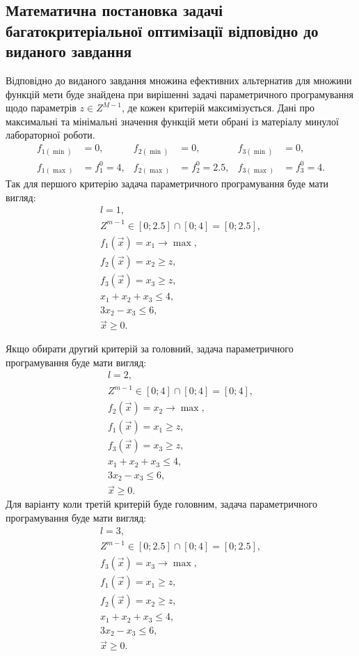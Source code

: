 \subsection{Математична постановка задачі багатокритеріальної оптимізації відповідно до виданого завдання}

Відповідно до виданого завдання множина ефективних альтернатив для множини функцій мети буде знайдена при вирішенні задачі параметричного програмування щодо параметрів $z \in Z^{M-1}$, де кожен критерій максимізується.
Дані про максимальні та мінімальні значення функцій мети обрані із матеріалу минулої лабораторної роботи.
\begin{align*}
    f_{1(\min)}&=0, &   f_{2(\min)}&=0, &   f_{3(\min)}&=0, \\
    f_{1(\max)}&=f_1^0=4,   &   f_{2(\max)}&=f_2^0=2.5, &   f_{3(\max)}&=f_3^0=4.
\end{align*} 
\clearpage
Так для першого критерію задача параметричного програмування буде мати вигляд:
\begin{gather*} 
    l = 1, \\
    Z^{m-1} \in [0; 2.5] \cap [0; 4] = [0; 2.5], \\
    f_1 (\vec{x}) = x_1 \to \max, \\
    f_2 (\vec{x}) = x_2 \geqslant z,  \\
    f_3 (\vec{x}) = x_3 \geqslant z,  \\
    x_1 + x_2 + x_3 \leqslant 4, \\
    3 x_2 - x_3 \leqslant 6, \\
    \vec{x} \geqslant 0.
\end{gather*}

Якщо обирати другий критерій за головний, задача параметричного програмування буде мати вигляд:
\begin{gather*} 
    l = 2, \\
    Z^{m-1} \in [0; 4] \cap [0; 4] = [0; 4], \\
    f_2 (\vec{x}) = x_2 \to \max, \\
    f_1 (\vec{x}) = x_1 \geqslant z,  \\
    f_3 (\vec{x}) = x_3 \geqslant z,  \\
    x_1 + x_2 + x_3 \leqslant 4, \\
    3 x_2 - x_3 \leqslant 6, \\
    \vec{x} \geqslant 0.
\end{gather*}
\clearpage
Для варіанту коли третій критерій буде головним, задача параметричного програмування буде мати вигляд:
\begin{gather*}
    l = 3, \\ 
    Z^{m-1} \in [0; 2.5] \cap [0; 4] = [0; 2.5], \\
    f_3 (\vec{x}) = x_3 \to \max, \\
    f_1 (\vec{x}) = x_1 \geqslant z,  \\
    f_2 (\vec{x}) = x_2 \geqslant z,  \\
    x_1 + x_2 + x_3 \leqslant 4, \\
    3 x_2 - x_3 \leqslant 6, \\
    \vec{x} \geqslant 0.
\end{gather*}

